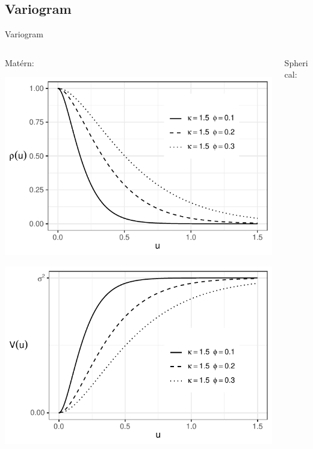 \documentclass[
  ignorenonframetext,
]{beamer}
\begin{document}
\hypertarget{variogram-2}{%
\subsection{Variogram}\label{variogram-2}}

\begin{frame}{Variogram}
\small

\begin{columns}[T]
\begin{column}{0.48\textwidth}
Matérn:

\includegraphics{Lecture_1_files/figure-beamer/unnamed-chunk-48-1.pdf}

\includegraphics{Lecture_1_files/figure-beamer/unnamed-chunk-49-1.pdf}
\end{column}

\begin{column}{0.48\textwidth}
Spherical:


\end{column}
\end{columns}
\end{frame}
\end{document}

